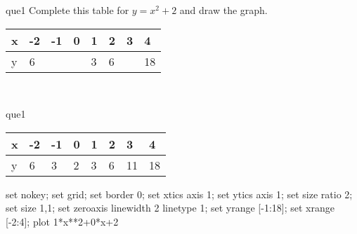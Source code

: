 \documentclass[13.5pt, varwidth=true]{beamer}
\begin{document}
\begin{frame}[shrink=19,fragile]
	\begin{beamercolorbox}[rounded=true, left, shadow=true,wd=14.8cm]{que1}
		 Complete this table for $y = x^{2} + 2$ and draw the graph. \\[0.3cm] \renewcommand{\arraystretch}{1.2}\begin{tabular}{|C|C|C|C|C|C|C|C|} \hline x & -2 & -1 & 0 & 1 & 2 & 3 & 4 \\ \hline y & 6 &  &  & 3 & 6 &  & 18\\ \hline \end{tabular}\\[0.3cm]
	\end{beamercolorbox}
\end{frame}
\begin{frame}[shrink=19,fragile]
	\begin{beamercolorbox}[rounded=true, left, shadow=true,wd=14.8cm]{que1}
		\renewcommand{\arraystretch}{1.2}\begin{tabular}{|C|C|C|C|C|C|C|C|} \hline x & -2 & -1 & 0 & 1 & 2 & 3 & 4 \\ \hline y & 6 & 3 & 2 & 3 & 6 & 11 & 18\\ \hline \end{tabular}\begin{gnuplot}[terminal=pdf] set nokey; set grid; set border 0; set xtics axis 1; set ytics axis 1; set size ratio 2; set size 1,1; set zeroaxis linewidth 2 linetype 1; set yrange [-1:18]; set xrange [-2:4]; plot 1*x**2+0*x+2 \end{gnuplot}
	\end{beamercolorbox}
\end{frame}
\end{document}
